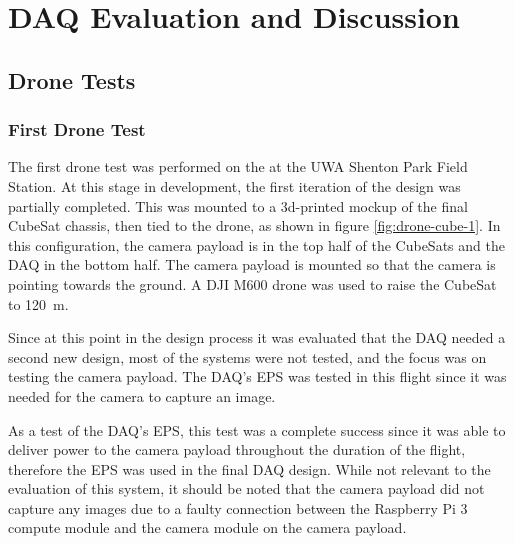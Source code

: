 \documentclass{report}
\begin{document}
\chapter{DAQ Evaluation and Discussion}

\section{Drone Tests}
\subsection{First Drone Test}

The first drone test was performed on the  at the UWA Shenton Park Field Station. At this stage in development, the first iteration of the design was partially completed. This was mounted to a 3d-printed mockup of the final CubeSat chassis, then tied to the drone, as shown in figure \ref{fig:drone-cube-1}. In this configuration, the camera payload is in the top half of the CubeSats and the DAQ in the bottom half. The camera payload is mounted so that the camera is pointing towards the ground. A DJI M600 drone was used to raise the CubeSat to \SI{120}{\metre}.

Since at this point in the design process it was evaluated that the DAQ needed a second new design, most of the systems were not tested, and the focus was on testing the camera payload. The DAQ's EPS was tested in this flight since it was needed for the camera to capture an image.

As a test of the DAQ's EPS, this test was a complete success since it was able to deliver power to the camera payload throughout the duration of the flight, therefore the EPS was used in the final DAQ design. While not relevant to the evaluation of this system, it should be noted that the camera payload did not capture any images due to a faulty connection between the Raspberry Pi 3 compute module and the camera module on the camera payload.
\end{document}

